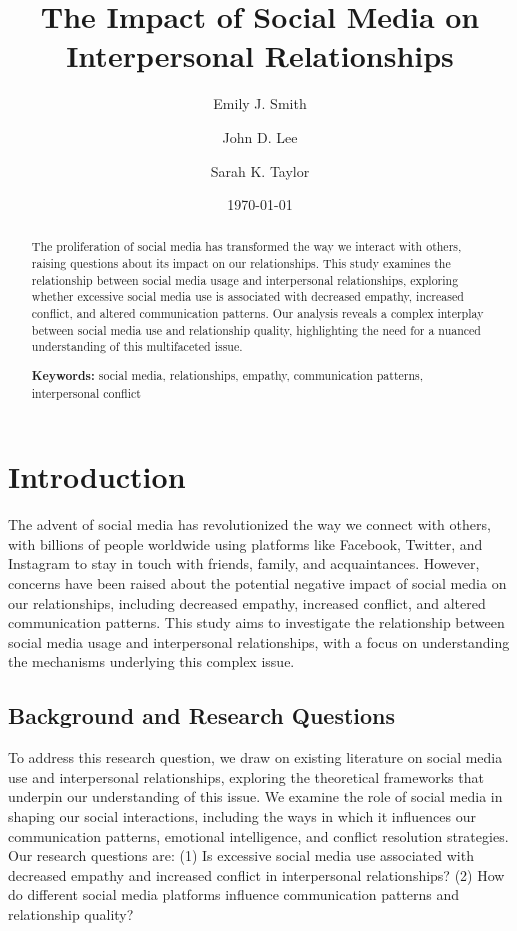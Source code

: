 \documentclass[12pt,a4paper]{article}
\title{The Impact of Social Media on Interpersonal Relationships}
\author{Emily J. Smith \and John D. Lee \and Sarah K. Taylor}
\date{\today}
\begin{document}
\maketitle
\thispagestyle{empty}

\begin{abstract}
\setlength{\parindent}{0pt}
\noindent
The proliferation of social media has transformed the way we interact with others, raising questions about its impact on our relationships. This study examines the relationship between social media usage and interpersonal relationships, exploring whether excessive social media use is associated with decreased empathy, increased conflict, and altered communication patterns. Our analysis reveals a complex interplay between social media use and relationship quality, highlighting the need for a nuanced understanding of this multifaceted issue.

\textbf{Keywords:} social media, relationships, empathy, communication patterns, interpersonal conflict
\end{abstract}

\newpage
\tableofcontents
\newpage

\twocolumn
\section{Introduction}
The advent of social media has revolutionized the way we connect with others, with billions of people worldwide using platforms like Facebook, Twitter, and Instagram to stay in touch with friends, family, and acquaintances. However, concerns have been raised about the potential negative impact of social media on our relationships, including decreased empathy, increased conflict, and altered communication patterns. This study aims to investigate the relationship between social media usage and interpersonal relationships, with a focus on understanding the mechanisms underlying this complex issue.

\subsection{Background and Research Questions}
To address this research question, we draw on existing literature on social media use and interpersonal relationships, exploring the theoretical frameworks that underpin our understanding of this issue. We examine the role of social media in shaping our social interactions, including the ways in which it influences our communication patterns, emotional intelligence, and conflict resolution strategies. Our research questions are: (1) Is excessive social media use associated with decreased empathy and increased conflict in interpersonal relationships? (2) How do different social media platforms influence communication patterns and relationship quality?
\end{document}
